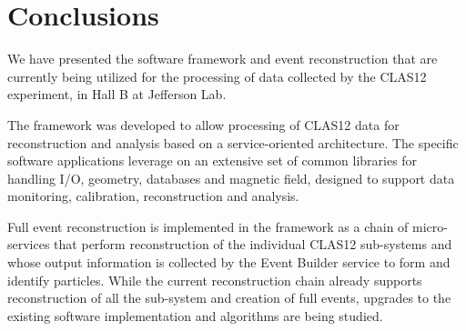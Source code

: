 \section{Conclusions}

We have presented the software framework and event reconstruction that are currently being utilized for the processing of data collected by the CLAS12 experiment, in Hall B at Jefferson Lab.  

The framework was developed to allow processing of CLAS12 data for reconstruction and analysis based on a service-oriented architecture. The specific software applications leverage on an extensive set of common libraries for handling I/O, geometry, databases and magnetic field, designed to support data monitoring, calibration, reconstruction and analysis.

Full event reconstruction is implemented in the framework as a chain of micro-services that perform reconstruction of the individual CLAS12 sub-systems and whose output information is collected by the Event Builder service to form and identify particles. While the current reconstruction chain already supports reconstruction of all the sub-system and creation of full events, upgrades to the existing software implementation and algorithms are being studied.